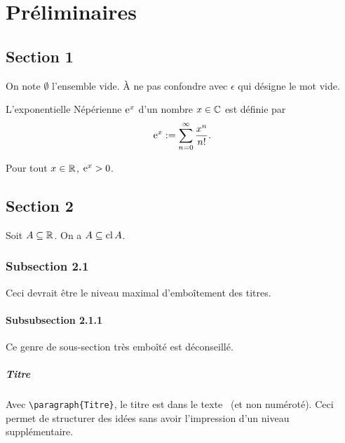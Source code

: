 \chapter{Préliminaires}
\label{ch:prelim}


\section{Section 1}

On note $\emptyset$ l'ensemble vide.  À ne pas confondre avec
$\epsilon$ qui désigne le mot vide.

\begin{definition}
  \label{def:expo}
  L'exponentielle Népérienne $\e^x$ d'un nombre $x \in \IC$ est
  définie par
  \begin{equation}
    \label{eq:exp}
    \e^x := \sum_{n=0}^\infty \frac{x^n}{n!}.
  \end{equation}
\end{definition}

\begin{proposition}
  \label{pos-expo}
  Pour tout $x \in \IR$, $\e^x > 0$.
\end{proposition}


\section{Section 2}

\begin{lemma}
  \label{closure}
  Soit $A \subseteq \IR$.  On a $A \subseteq \cl A$.
\end{lemma}

\subsection{Subsection 2.1}

Ceci devrait être le niveau maximal d'emboîtement des titres.

\subsubsection{Subsubsection 2.1.1}

Ce genre de sous-section très emboîté est déconseillé.

\paragraph{Titre}

Avec \verb/\paragraph{Titre}/, le titre est \og dans le texte \fg\ (et non
numéroté).  Ceci permet de structurer des idées sans avoir
l'impression d'un niveau supplémentaire.


\endinput
